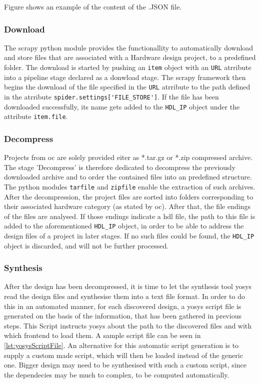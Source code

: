 Figure  shows an example of the content of the .JSON file. 

\subsubsection{Download}
The \Gls{scrapy} \Gls{python} module provides the functionallity to automatically download and
store files that are associated with a Hardware design project, to a predefined
folder. The download is started by pushing an \lstinline{item} object with an \lstinline{URL} atrribute into a pipeline stage declared as a donwload stage. The \Gls{scrapy} framework then begins the download of the file specified in the \lstinline{URL} atrribute to the path defined in the atrribute \lstinline{spider.settings['FILE_STORE']}. If the file has been downloaded successfully, its name gets added to the \lstinline{HDL_IP} object under the attribute \lstinline{item.file}.  

\subsubsection{Decompress} 
Projects from \gls{oc} are solely provided eiter as *.tar.gz or *.zip compressed archive. The stage 'Decompress' is therefore dedicated to decompress the previously downloaded archive and to order the contained files into an predefined structure. The \Gls{python} modules \lstinline{tarfile} and \lstinline{zipfile} enable the extraction of such archives.
After the decompression, the project files are sorted into folders corresponding to 
their associated hardware category (as stated by \gls{oc}). After that, the file 
endings of the files are analysed. If those endings indicate a \gls{hdl} file, the path 
to this file is added to the aforementioned \lstinline{HDL_IP} object, in order to be able to
address the design files of a project in later stages. If no such files could be found, the \lstinline{HDL_IP} object is discarded, and will not be further processed. 

\subsubsection{Synthesis} 
After the design has been decompressed, it is time to let the synthesis tool \Gls{yosys} read the design files and synthesise them into a text file format. In order to do this in an automated manner, for each discovered design, a yosys script file is generated on the basis of the information, that has been gathered in previous steps. This Script instructs \Gls{yosys} about the path to the discovered files and with which frontend to load them. A sample script file can be seen in \cref{lst:yosysScriptFile}.
An alternative for this automatic script generation is to supply a custom made script, which will then be loaded instead of the generic one. Bigger design may need to be synthesised with such a custom script, since the dependecies may be much to complex, to be computed automatically. 

